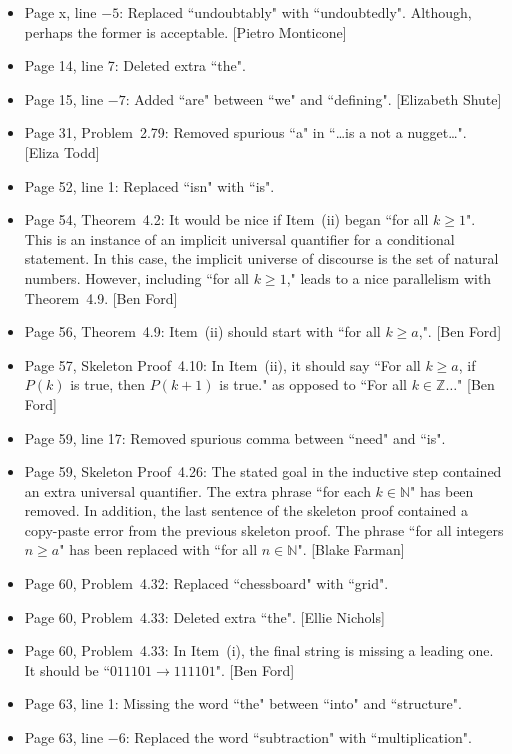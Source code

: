 \documentclass[11pt]{article}%
\begin{document}
\begin{itemize}
\item Page x, line $-5$: Replaced ``undoubtably" with ``undoubtedly". Although, perhaps the former is acceptable. [Pietro Monticone]
\item Page 14, line 7: Deleted extra ``the".
\item Page 15, line $-7$: Added ``are" between ``we" and ``defining". [Elizabeth Shute]
\item Page 31, Problem~2.79: Removed spurious ``a" in ``\ldots is a not a nugget\ldots". [Eliza Todd]
\item Page 52, line 1: Replaced ``isn" with ``is".
\item Page 54, Theorem~4.2: It would be nice if Item~(ii) began ``for all $k\geq 1$".  This is an instance of an implicit universal quantifier for a conditional statement.  In this case, the implicit universe of discourse is the set of natural numbers.  However, including ``for all $k\geq 1$," leads to a nice parallelism with Theorem~4.9. [Ben Ford]
\item Page 56, Theorem~4.9: Item~(ii) should start with ``for all $k\geq a$,". [Ben Ford]
\item Page 57, Skeleton Proof~4.10: In Item~(ii), it should say ``For all $k\geq a$, if $P(k)$ is true, then $P(k+1)$ is true." as opposed to ``For all $k\in\mathbb{Z}\ldots$" [Ben Ford]
\item Page 59, line 17: Removed spurious comma between ``need" and ``is".
\item Page 59, Skeleton Proof~4.26: The stated goal in the inductive step contained an extra universal quantifier.  The extra phrase ``for each $k \in \mathbb{N}$" has been removed.  In addition, the last sentence of the skeleton proof contained a copy-paste error from the previous skeleton proof.  The phrase ``for all integers $n \ge a$" has been replaced with ``for all $n\in\mathbb{N}$". [Blake Farman]
\item Page 60, Problem~4.32: Replaced ``chessboard" with ``grid".
\item Page 60, Problem~4.33: Deleted extra ``the". [Ellie Nichols]
\item Page 60, Problem~4.33: In Item~(i), the final string is missing a leading one.  It should be ``$011101 \to 111101$". [Ben Ford]
\item Page 63, line 1: Missing the word ``the" between ``into" and ``structure".
\item Page 63, line $-6$: Replaced the word ``subtraction" with ``multiplication". 

\end{itemize}
\end{document}
